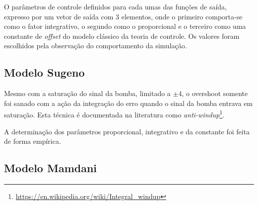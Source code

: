 \documentclass[
	twoside,				%
	twocolumn,				%
	english,				%
	brazil,					%
]{article}
\begin{document}

O parâmetros de controle definidos para cada umas das funções de saída, expresso por um vetor de saída com 3 elementos, onde o primeiro comporta-se como o fator integrativo, o segundo como o proporcional e o terceiro como uma constante de \textit{offset} do modelo clássico da teoria de controle. Os valores foram escolhidos pela observação do comportamento da simulação.


\subsection{Modelo Sugeno}

Mesmo com a saturação do sinal da bomba, limitado a $\pm4$, o overshoot somente foi sanado com a ação da integração do erro quando o sinal da bomba entrava em saturação. Esta técnica é documentada na literatura como \textit{anti-windup}\footnote{\url{https://en.wikipedia.org/wiki/Integral_windup}}.

A determinação dos parâmetros proporcional, integrativo e da constante foi feita de forma empírica.

\subsection{Modelo Mamdani}
\end{document}
